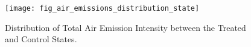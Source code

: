 \begin{figure}[H]
    \centering
    \texttt{[image: fig\_air\_emissions\_distribution\_state]}
    \caption{Distribution of Total Air Emission Intensity between the Treated and Control States.}
    \label{fig:air-emissions-distribution}
\end{figure}